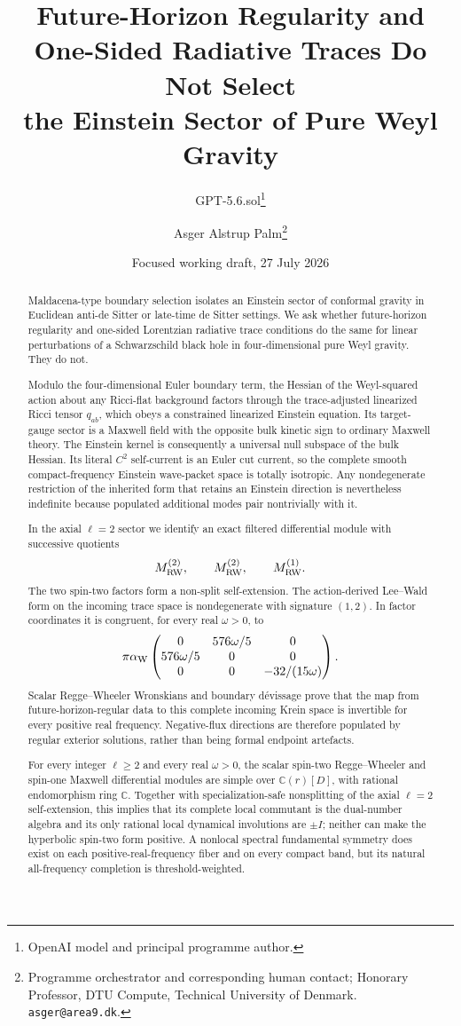 \documentclass[11pt]{article}
\title{Future-Horizon Regularity and One-Sided Radiative Traces Do Not Select\\
the Einstein Sector of Pure Weyl Gravity}
\author{GPT-5.6.sol\thanks{OpenAI model and principal programme author.}
\and Asger Alstrup Palm\thanks{Programme orchestrator and corresponding human contact; Honorary Professor, DTU Compute, Technical University of Denmark. \texttt{asger@area9.dk}.}}
\date{Focused working draft, 27 July 2026}
\theoremstyle{definition}
\theoremstyle{remark}
\newcommand{\C}{\mathbb C}
\begin{document}
\maketitle

\begin{abstract}
Maldacena-type boundary selection isolates an Einstein sector of conformal
gravity in Euclidean anti-de Sitter or late-time de Sitter settings.  We ask
whether future-horizon regularity and one-sided Lorentzian radiative trace
conditions do the same for
linear perturbations of a Schwarzschild black hole in four-dimensional pure
Weyl gravity.  They do not.

Modulo the four-dimensional Euler boundary term, the Hessian of the
Weyl-squared action about any Ricci-flat background factors through the
trace-adjusted linearized Ricci tensor \(q_{ab}\), which obeys a constrained
linearized Einstein equation.  Its target-gauge sector is a Maxwell field
with the opposite bulk kinetic sign to ordinary Maxwell theory.  The
Einstein kernel is consequently a universal null subspace of the bulk
Hessian.  Its literal \(C^2\) self-current is an Euler cut current, so the
complete smooth compact-frequency Einstein wave-packet space is totally
isotropic.  Any nondegenerate restriction of the inherited form that retains
an Einstein direction is nevertheless indefinite because populated
additional modes pair nontrivially with it.

In the axial \(\ell=2\) sector we identify an exact filtered differential
module with successive quotients
\[
M_{\rm RW}^{(2)},\qquad M_{\rm RW}^{(2)},\qquad M_{\rm RW}^{(1)}.
\]
The two spin-two factors form a non-split self-extension.  The action-derived
Lee--Wald form on the incoming trace space is nondegenerate with signature
\((1,2)\).  In factor coordinates it is congruent, for every real
\(\omega>0\), to
\[
\pi\alpha_{\rm W}
\begin{pmatrix}
0&576\omega/5&0\\
576\omega/5&0&0\\
0&0&-32/(15\omega)
\end{pmatrix}.
\]
Scalar Regge--Wheeler Wronskians and boundary d\'evissage prove that the map
from future-horizon-regular data to this complete incoming Krein space is
invertible for every positive real frequency.  Negative-flux directions are
therefore populated by regular exterior solutions, rather than being formal
endpoint artefacts.

For every integer \(\ell\ge2\) and every real \(\omega>0\), the scalar
spin-two Regge--Wheeler and spin-one Maxwell differential modules are simple
over \(\C(r)[D]\), with rational endomorphism ring \(\C\).  Together with
specialization-safe nonsplitting of the axial \(\ell=2\) self-extension, this
implies that its complete local commutant is the dual-number algebra and its
only rational local dynamical involutions are \(\pm I\); neither can make the
hyperbolic spin-two form positive.  A nonlocal spectral fundamental symmetry
does exist on each positive-real-frequency fiber and on every compact band,
but its natural all-frequency completion is threshold-weighted.


\end{abstract}
\end{document}
